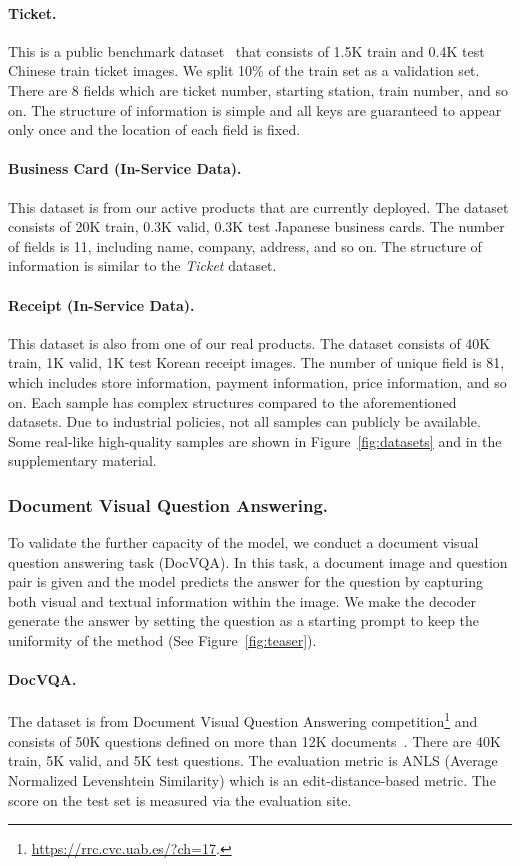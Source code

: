 \documentclass[runningheads]{llncs}
\begin{document}
\paragraph{Ticket.}
This is a public benchmark dataset~\cite{eaten} that consists of 1.5K train and 0.4K test Chinese train ticket images. 
We split 10\% of the train set as a validation set.
There are 8 fields which are ticket number, starting station, train number, and so on.
The structure of information is simple and all keys are guaranteed to appear only once and the location of each field is fixed.

\paragraph{Business Card (In-Service Data).}
This dataset is from our active products that are currently deployed.
The dataset consists of 20K train, 0.3K valid, 0.3K test Japanese business cards.
The number of fields is 11, including name, company, address, and so on.
The structure of information is similar to the \textit{Ticket} dataset.

\paragraph{Receipt (In-Service Data).}
This dataset is also from one of our real products. The dataset consists of 40K train, 1K valid, 1K test Korean receipt images.
The number of unique field is 81, which includes store information, payment information, price information, and so on.
Each sample has complex structures compared to the aforementioned datasets.
Due to industrial policies, not all samples can publicly be available. Some real-like high-quality samples are shown in Figure~\ref{fig:datasets} and in the supplementary material.

\subsubsection{Document Visual Question Answering.}
To validate the further capacity of the model, we conduct a document visual question answering task (DocVQA).
In this task, a document image and question pair is given and the model predicts the answer for the question by capturing both visual and textual information within the image. We make the decoder generate the answer by setting the question as a starting prompt to keep the uniformity of the method (See Figure~\ref{fig:teaser}).

\paragraph{DocVQA.}
The dataset is from Document Visual Question Answering competition\footnote{\url{https://rrc.cvc.uab.es/?ch=17}.} and consists of 50K questions defined on more than 12K documents~\cite{mathew2021docvqa}.
There are 40K train, 5K valid, and 5K test questions.
The evaluation metric is ANLS (Average Normalized Levenshtein Similarity) which is an edit-distance-based metric.
The score on the test set is measured via the evaluation site.
\end{document}
